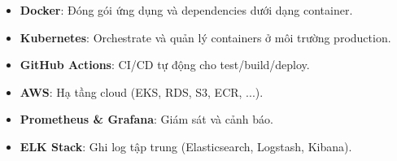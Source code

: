 \begin{itemize}
    \item \textbf{Docker}: Đóng gói ứng dụng và dependencies dưới dạng container.
    \item \textbf{Kubernetes}: Orchestrate và quản lý containers ở môi trường production.
    \item \textbf{GitHub Actions}: CI/CD tự động cho test/build/deploy.
    \item \textbf{AWS}: Hạ tầng cloud (EKS, RDS, S3, ECR, ...).
    \item \textbf{Prometheus \& Grafana}: Giám sát và cảnh báo.
    \item \textbf{ELK Stack}: Ghi log tập trung (Elasticsearch, Logstash, Kibana).
\end{itemize}

